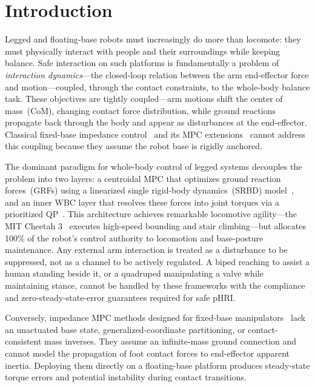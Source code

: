 \section{Introduction}

Legged and floating-base robots must increasingly do more than locomote: they
must physically interact with people and their surroundings while keeping
balance. Safe interaction on such platforms is fundamentally a problem of
\emph{interaction dynamics}---the closed-loop relation between the arm
end-effector force and motion---coupled, through the contact constraints, to
the whole-body balance task.
These objectives are tightly coupled---arm motions shift the center of
mass~(CoM), changing contact force distribution, while ground reactions
propagate back through the body and appear as disturbances at the
end-effector.
Classical fixed-base impedance control~\cite{hogan1985impedance} and its
MPC extensions~\cite{cao2023passive,cao2026impedance} cannot address this
coupling because they assume the robot base is rigidly anchored.

The dominant paradigm for whole-body control of legged systems decouples
the problem into two layers: a centroidal MPC that optimizes ground
reaction forces~(GRFs) using a linearized single rigid-body dynamics~(SRBD)
model~\cite{dicarlo2018dynamic,kim2019highly}, and an inner WBC layer that
resolves these forces into joint torques via a prioritized
QP~\cite{bellicoso2016perception,koolen2016design}.
This architecture achieves remarkable locomotive agility---the MIT Cheetah
3~\cite{dicarlo2018dynamic} executes high-speed bounding and stair
climbing---but allocates 100\% of the robot's control authority to
locomotion and base-posture maintenance.
Any external arm interaction is treated as a disturbance to be suppressed,
not as a channel to be actively regulated.
A biped reaching to assist a human standing beside it, or a quadruped
manipulating a valve while maintaining stance, cannot be handled by these
frameworks with the compliance and zero-steady-state-error guarantees
required for safe pHRI.

Conversely, impedance MPC methods designed for fixed-base
manipulators~\cite{cao2026impedance,cao2023passive,haninger2022model,roveda2020model}
lack an unactuated base state, generalized-coordinate partitioning, or
contact-consistent mass inverses.
They assume an infinite-mass ground connection and cannot model the
propagation of foot contact forces to end-effector apparent inertia.
Deploying them directly on a floating-base platform produces steady-state
torque errors and potential instability during contact transitions.

